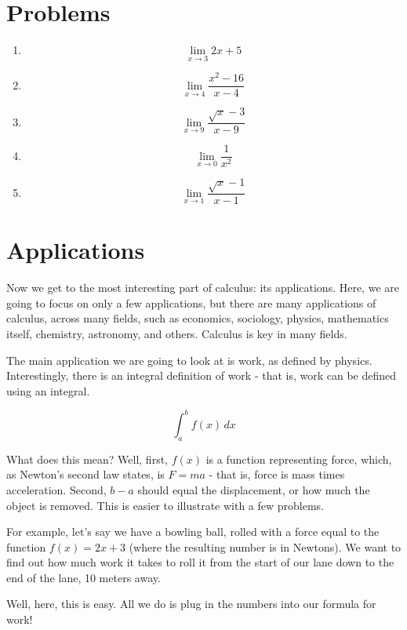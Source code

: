 \documentclass[12pt]{article}
\begin{document}
\section{Problems}
\begin{enumerate}
    \item $$\lim\limits_{x\rightarrow 3} 2x+5$$
    \item $$\lim\limits_{x\rightarrow 4} \frac{x^2-16}{x-4}$$
    \item $$\lim\limits_{x\rightarrow 9} \frac{\sqrt{x}-3}{x-9}$$
    \item $$\lim\limits_{x\rightarrow 0} \frac{1}{x^2}$$
    \item $$\lim\limits_{x\rightarrow 1} \frac{\sqrt{x}-1}{x-1}$$
\end{enumerate}

\section{Applications}

Now we get to the most interesting part of calculus: its applications. Here, we are going to focus on only a few applications, but there are many applications of calculus, across many fields, such as economics, sociology, physics, mathematics itself, chemistry, astronomy, and others. Calculus is key in many fields.

The main application we are going to look at is work, as defined by physics. Interestingly, there is an integral definition of work - that is, work can be defined using an integral.

\begin{equation*}
    \int^b_a f(x) \, dx
\end{equation*}

What does this mean? Well, first, $f(x)$ is a function representing force, which, as Newton's second law states, is $F = ma$ - that is, force is mass times acceleration. Second, $b - a$ should equal the displacement, or how much the object is removed. This is easier to illustrate with a few problems.

For example, let's say we have a bowling ball, rolled with a force equal to the function $f(x) = 2x+3$ (where the resulting number is in Newtons). We want to find out how much work it takes to roll it from the start of our lane down to the end of the lane, 10 meters away.

Well, here, this is easy. All we do is plug in the numbers into our formula for work! 
\end{document}
